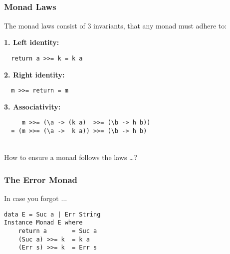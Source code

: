 \documentclass{beamer}
\newcommand{\bind}{\texttt{>>=}}
\newcommand{\ret}{\texttt{return}}
\newcommand{\bs}{\texttt{\char`\\}}
\newcommand{\at}{\texttt{a}}
\newcommand{\mt}{\texttt{k}}
\begin{document}
\subsection{}
\begin{frame}[fragile]
 \frametitle{Monad Laws}
The monad laws consist of 3 invariants, that any monad must adhere to:

\textbf{1. Left identity:}
\begin{lstlisting}
  return a >>= k = k a
\end{lstlisting}

\textbf{2. Right identity:}
\begin{lstlisting}
  m >>= return = m
\end{lstlisting}

\textbf{3. Associativity:}
\begin{lstlisting}
     m >>= (\a -> (k a)  >>= (\b -> h b)) 
  = (m >>= (\a ->  k a)) >>= (\b -> h b)
\end{lstlisting}
\begin{align*}
\end{align*}
\end{frame}
\begin{frame}
How to ensure a monad follows the laws \ldots ?
\end{frame}
\begin{frame}[fragile]
\frametitle{The Error Monad}
In case you forgot $\ldots$
\begin{lstlisting}
data E = Suc a | Err String
Instance Monad E where
    return a       = Suc a     
    (Suc a) >>= k  = k a
    (Err s) >>= k  = Err s
\end{lstlisting}
\end{frame}
\end{document}
